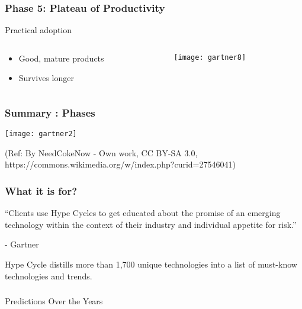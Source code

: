 \begin{frame}[fragile]\frametitle{Phase 5: Plateau of Productivity}

Practical adoption


 \begin{columns}
  \begin{column}{0.55\linewidth}
\begin{itemize}
\item Good, mature products
\item Survives longer
\end{itemize}
  \end{column}%
  \begin{column}{0.45\linewidth}
			\begin{center}
			\texttt{[image: gartner8]}
			\end{center}
  \end{column}
 \end{columns}
 
\end{frame}


\begin{frame}[fragile]\frametitle{Summary : Phases}

\begin{center}
\texttt{[image: gartner2]}
\end{center}

{\tiny (Ref: By NeedCokeNow - Own work, CC BY-SA 3.0, https://commons.wikimedia.org/w/index.php?curid=27546041)}
\end{frame}

\begin{frame}[fragile]\frametitle{What it is for?}

``Clients use Hype Cycles to get educated about the promise of an emerging technology within the context of their industry and individual appetite for risk.''

- Gartner 

Hype Cycle distills more than 1,700 unique technologies into a list of must-know technologies and trends.

\end{frame}

\begin{frame}[fragile]\frametitle{}
\begin{center}
{\Large Predictions Over the Years}
\end{center}
\end{frame}

